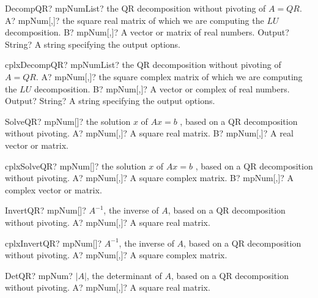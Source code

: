 \documentclass[12pt,a4paper,openany]{book}
\begin{document}
\begin{mpFunctionsExtract}
\mpFunctionThree
{DecompQR? mpNumList? the QR decomposition without pivoting of $A = QR$.}
{A? mpNum[,]? the square real matrix of which we are computing the $LU$ decomposition.}
{B? mpNum[,]? A vector or matrix of real numbers.}
{Output? String? A string specifying the output options.}
\end{mpFunctionsExtract}

\begin{mpFunctionsExtract}
\mpFunctionThree
{cplxDecompQR? mpNumList? the QR decomposition without pivoting of $A = QR$.}
{A? mpNum[,]? the square complex matrix of which we are computing the $LU$ decomposition.}
{B? mpNum[,]? A vector or complex of real numbers.}
{Output? String? A string specifying the output options.}
\end{mpFunctionsExtract}

\begin{mpFunctionsExtract}
\mpFunctionTwo
{SolveQR? mpNum[]? the solution $x$ of $A x = b$ , based on a QR decomposition without pivoting.}
{A? mpNum[,]? A square real matrix.}
{B? mpNum[,]? A real vector or matrix.}
\end{mpFunctionsExtract}

\begin{mpFunctionsExtract}
\mpFunctionTwo
{cplxSolveQR? mpNum[]? the solution $x$ of $A x = b$ , based on a QR decomposition without pivoting.}
{A? mpNum[,]? A square complex matrix.}
{B? mpNum[,]? A complex vector or matrix.}
\end{mpFunctionsExtract}

\begin{mpFunctionsExtract}
\mpFunctionOne
{InvertQR? mpNum[]? $A^{-1}$, the inverse of $A$, based on a QR decomposition without pivoting.}
{A? mpNum[,]? A square real matrix.}
\end{mpFunctionsExtract}

\begin{mpFunctionsExtract}
\mpFunctionOne
{cplxInvertQR? mpNum[]? $A^{-1}$, the inverse of $A$, based on a QR decomposition without pivoting.}
{A? mpNum[,]? A square complex matrix.}
\end{mpFunctionsExtract}

\begin{mpFunctionsExtract}
\mpFunctionOne
{DetQR? mpNum? $|A|$, the determinant of $A$, based on a QR decomposition without pivoting.}
{A? mpNum[,]? A square real matrix.}
\end{mpFunctionsExtract}
\end{document}
